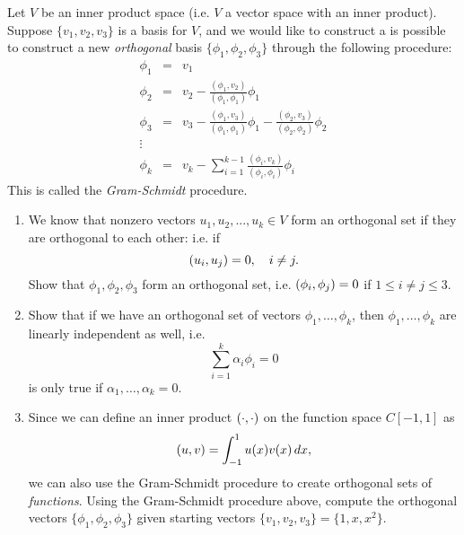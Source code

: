 
Let $ V$ be an inner product space (i.e. $V$ a vector space with an inner product). Suppose  $ \{{v}_1, {v}_2, { v}_3\} $ is a basis for $V$, and we would like to construct a is possible to construct a new \emph{orthogonal} basis $ \{{ \phi}_1, { \phi}_2, { \phi}_3 \}$ through the following procedure:
\begin{eqnarray*}
{ \phi}_1 &=& { v}_1 \\
{ \phi}_2 &=& { v}_2-\frac{({ \phi}_1, { v}_2)}{({ \phi}_1, { \phi}_1)} { \phi}_1\\
{ \phi}_3 &=& { v}_3-\frac{({ \phi}_1, { v}_3)}{({ \phi}_1, { \phi}_1)} { \phi}_1 - \frac{({ \phi}_2, { v}_3)}{({ \phi}_2, { \phi}_2)} { \phi}_2\\
\vdots\\
{ \phi}_k &=& { v}_k- \sum_{i = 1}^{k-1}\frac{({ \phi}_i, { v}_k)}{({ \phi}_i, { \phi}_i)} { \phi}_i
\end{eqnarray*}
This is called the \emph{Gram-Schmidt} procedure.  
\begin{enumerate}
\item We know that nonzero vectors $u_1, u_2, . . . , u_k \in V$ form an orthogonal set if they are orthogonal to
each other: i.e. if 
\[
(u_i, u_j) = 0, \quad i\neq j.
\]
Show that $\phi_1,\phi_2,\phi_3$ form an orthogonal set, i.e. $(\phi_i, \phi_j)=0$ if $1 \leq i \neq j\leq 3$.  
\item Show that if we have an orthogonal set of vectors $\phi_1,\ldots, \phi_k$, then $\phi_1,\ldots, \phi_k$ are linearly independent as well, i.e. 
\[
\sum_{i = 1}^k \alpha_i\phi_i = 0
\]
is only true if $\alpha_1, \ldots, \alpha_k = 0$. 
\item Since we can define an inner product $(\cdot,\cdot)$ on the function space $C[-1,1]$ as
\[
(u,v) = \int_{-1}^1 u(x)v(x)\, dx,
\]
we can also use the Gram-Schmidt procedure to create orthogonal sets of \emph{functions}.  Using the Gram-Schmidt procedure above, compute the orthogonal vectors $ \{{\phi}_1, {\phi}_2, { \phi}_3\} $ given starting vectors $\{v_1, v_2, v_3\}=\{1, x, x^2\}$.  

\end{enumerate}

 



